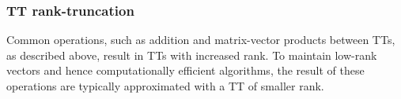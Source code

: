 \documentclass[10pt,preprint]{elsarticle}
\begin{document}
\subsubsection{TT rank-truncation} 
\label{sec:truncation}

Common operations, such as addition and matrix-vector products between TTs, as described above, result in TTs with increased rank. To maintain low-rank vectors and hence computationally efficient algorithms, the result of these operations are typically approximated with a TT of smaller rank.

\end{document}
